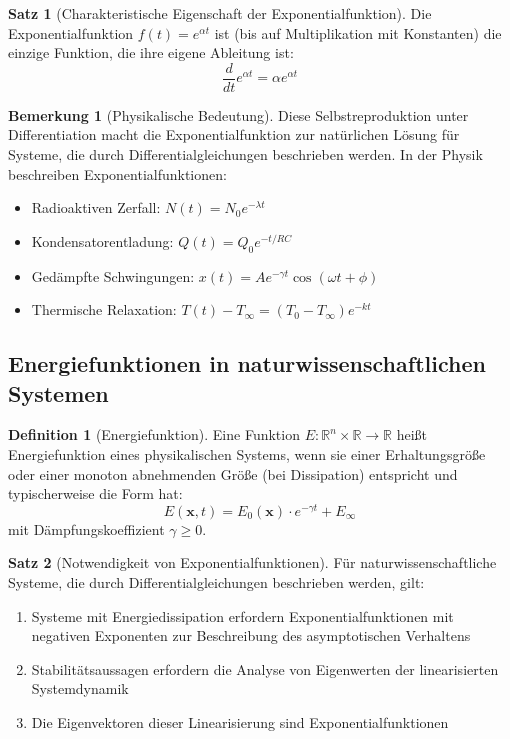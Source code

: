 ﻿\documentclass[a4paper,12pt]{report}
\theoremstyle{definition}
\newtheorem{definition}{Definition}[section]
\newtheorem{bemerkung}{Bemerkung}[section]
\newtheorem{satz}{Satz}[section]
\begin{document}
\begin{satz}[Charakteristische Eigenschaft der Exponentialfunktion]
	Die Exponentialfunktion $f(t) = e^{\alpha t}$ ist (bis auf Multiplikation mit Konstanten) die einzige Funktion, die ihre eigene Ableitung ist:
	\begin{equation}
		\frac{d}{dt} e^{\alpha t} = \alpha e^{\alpha t}
	\end{equation}
\end{satz}

\begin{bemerkung}[Physikalische Bedeutung]
	Diese Selbstreproduktion unter Differentiation macht die Exponentialfunktion zur natürlichen Lösung für Systeme, die durch Differentialgleichungen beschrieben werden. In der Physik beschreiben Exponentialfunktionen:
	\begin{itemize}
		\item[-] Radioaktiven Zerfall: $N(t) = N_0 e^{-\lambda t}$
		\item[-] Kondensatorentladung: $Q(t) = Q_0 e^{-t/RC}$
		\item[-] Gedämpfte Schwingungen: $x(t) = A e^{-\gamma t} \cos(\omega t + \phi)$
		\item[-] Thermische Relaxation: $T(t) - T_{\infty} = (T_0 - T_{\infty}) e^{-kt}$
	\end{itemize}
\end{bemerkung}

\subsection{Energiefunktionen in naturwissenschaftlichen Systemen}

\begin{definition}[Energiefunktion]
	Eine Funktion $E: \mathbb{R}^n \times \mathbb{R} \to \mathbb{R}$ heißt Energiefunktion eines physikalischen Systems, wenn sie einer Erhaltungsgröße oder einer monoton abnehmenden Größe (bei Dissipation) entspricht und typischerweise die Form hat:
	\begin{equation}
		E(\mathbf{x}, t) = E_0(\mathbf{x}) \cdot e^{-\gamma t} + E_{\infty}
	\end{equation}
	mit Dämpfungskoeffizient $\gamma \geq 0$.
\end{definition}

\begin{satz}[Notwendigkeit von Exponentialfunktionen]
	Für naturwissenschaftliche Systeme, die durch Differentialgleichungen beschrieben werden, gilt:
	\begin{enumerate}
		\item[-] Systeme mit Energiedissipation erfordern Exponentialfunktionen mit negativen Exponenten zur Beschreibung des asymptotischen Verhaltens
		\item[-] Stabilitätsaussagen erfordern die Analyse von Eigenwerten der linearisierten Systemdynamik
		\item[-] Die Eigenvektoren dieser Linearisierung sind Exponentialfunktionen
	\end{enumerate}
\end{satz}
\end{document}
